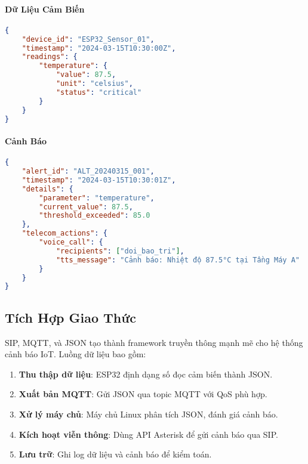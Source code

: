 \paragraph{Dữ Liệu Cảm Biến}
\begin{lstlisting}[language=json, caption=Payload cảm biến MQTT, label=lst:sensor_payload]
{
    "device_id": "ESP32_Sensor_01", 
    "timestamp": "2024-03-15T10:30:00Z",
    "readings": {
        "temperature": {
            "value": 87.5,         
            "unit": "celsius",
            "status": "critical"
        }
    }
}
\end{lstlisting}

\paragraph{Cảnh Báo}
\begin{lstlisting}[language=json, caption=Payload cảnh báo, label=lst:alert_payload]
{
    "alert_id": "ALT_20240315_001", 
    "timestamp": "2024-03-15T10:30:01Z",
    "details": {
        "parameter": "temperature",
        "current_value": 87.5,
        "threshold_exceeded": 85.0
    },
    "telecom_actions": {
        "voice_call": {
            "recipients": ["doi_bao_tri"],
            "tts_message": "Cảnh báo: Nhiệt độ 87.5°C tại Tầng Máy A"
        }
    }
}
\end{lstlisting}

\subsection{Tích Hợp Giao Thức}
\label{subsec:protocol_integration}

SIP, MQTT, và JSON tạo thành framework truyền thông mạnh mẽ cho hệ thống cảnh báo IoT. Luồng dữ liệu bao gồm:

\begin{enumerate}
    \item \textbf{Thu thập dữ liệu}: ESP32 định dạng số đọc cảm biến thành JSON.
    \item \textbf{Xuất bản MQTT}: Gửi JSON qua topic MQTT với QoS phù hợp.
    \item \textbf{Xử lý máy chủ}: Máy chủ Linux phân tích JSON, đánh giá cảnh báo.
    \item \textbf{Kích hoạt viễn thông}: Dùng API Asterisk để gửi cảnh báo qua SIP.
    \item \textbf{Lưu trữ}: Ghi log dữ liệu và cảnh báo để kiểm toán.
\end{enumerate}

